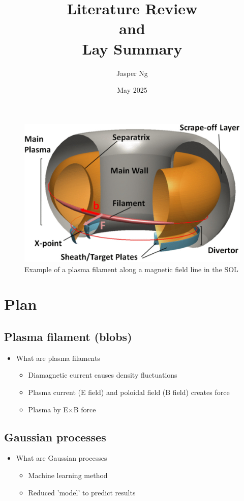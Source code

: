 \documentclass{article}
\title{\textbf{Literature Review \\and \\Lay Summary}}
\author{Jasper Ng}
\date{May 2025}
\begin{document}
\maketitle

\begin{figure}[h]
    \includegraphics[scale=0.6]{Fig1_plasma_filament.png}
    \normalsize{\caption{Example of a plasma filament along a magnetic field line in the SOL \cite{}}}
    \label{fig:fig1}
\end{figure}

\section*{Plan}
\subsection*{Plasma filament (blobs)}
\begin{itemize}
    \item What are plasma filaments \cite{omotani_effects_2015}
    \begin{itemize}
        \item Diamagnetic current causes density fluctuations
        \item Plasma current (E field) and poloidal field (B field) creates force
        \item Plasma by E$\times$B force
        
    \end{itemize}
\end{itemize}

\subsection*{Gaussian processes} 
\begin{itemize}
    \item What are Gaussian processes \cite{hornsby_gaussian_2024}
    \begin{itemize}    
        \item Machine learning method
        \item Reduced 'model' to predict results
    \end{itemize}
\end{itemize}

\nocite{*}
\printbibliography[title={References}]
\end{document}
